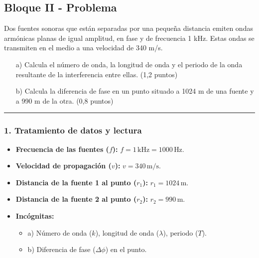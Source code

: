 \newpage

\subsection{Bloque II - Problema}
\label{subsec:A2_2010_sep_ext}

\begin{cajaenunciado}
Dos fuentes sonoras que están separadas por una pequeña distancia emiten ondas armónicas planas de igual amplitud, en fase y de frecuencia 1 kHz. Estas ondas se transmiten en el medio a una velocidad de 340 m/s.
\begin{enumerate}
    \item[a)] Calcula el número de onda, la longitud de onda y el periodo de la onda resultante de la interferencia entre ellas. (1,2 puntos)
    \item[b)] Calcula la diferencia de fase en un punto situado a 1024 m de una fuente y a 990 m de la otra. (0,8 puntos)
\end{enumerate}
\end{cajaenunciado}
\hrule

\subsubsection*{1. Tratamiento de datos y lectura}
\begin{itemize}
    \item \textbf{Frecuencia de las fuentes ($f$):} $f = 1 \, \text{kHz} = 1000 \, \text{Hz}$.
    \item \textbf{Velocidad de propagación ($v$):} $v = 340 \, \text{m/s}$.
    \item \textbf{Distancia de la fuente 1 al punto ($r_1$):} $r_1 = 1024 \, \text{m}$.
    \item \textbf{Distancia de la fuente 2 al punto ($r_2$):} $r_2 = 990 \, \text{m}$.
    \item \textbf{Incógnitas:}
    \begin{itemize}
        \item a) Número de onda ($k$), longitud de onda ($\lambda$), periodo ($T$).
        \item b) Diferencia de fase ($\Delta\phi$) en el punto.
    \end{itemize}
\end{itemize}

